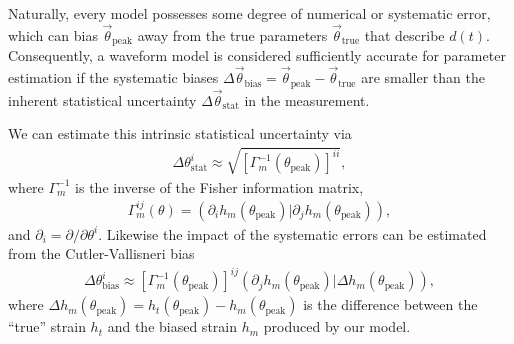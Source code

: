 \documentclass[%
 reprint,
 nofootinbib,
 amsmath,amssymb,
 aps,
 prd,
]{revtex4-2}
\begin{document}
Naturally, every model possesses some degree of numerical or systematic error, which can bias $\vec{\theta}_\mathrm{peak}$ away from the true parameters $\vec{\theta}_\mathrm{true}$ that describe $d(t)$. Consequently, a waveform model is considered sufficiently accurate for parameter estimation if the systematic biases $\Delta \vec{\theta}_\mathrm{bias} = \vec{\theta}_\mathrm{peak} - \vec{\theta}_\mathrm{true}$ are smaller than the inherent statistical uncertainty $\Delta \vec{\theta}_\mathrm{stat}$ in the measurement.

We can estimate this intrinsic statistical uncertainty via
\begin{align} \label{eqn:stat}
    \Delta {\theta}^{i}_\mathrm{stat} \approx \sqrt{\left[\Gamma^{-1}_m(\theta_\mathrm{peak})\right]^{ii}},
\end{align}
where $\Gamma^{-1}_m$ is the inverse of the Fisher information matrix,
\begin{align} \label{eqn:fisher}
    \Gamma^{ij}_m(\theta) = \left( {\partial_i h_m(\theta_\mathrm{peak})} \vert {\partial_j h_m(\theta_\mathrm{peak})} \right),
\end{align}
and $\partial_i = \partial/\partial \theta^i$.
Likewise the impact of the systematic errors can be estimated from the Cutler-Vallisneri bias \cite{CutlVall}
\begin{align} \label{eqn:bias}
    \Delta {\theta}^{i}_\mathrm{bias} \approx \left[\Gamma^{-1}_m(\theta_\mathrm{peak})\right]^{ij} \left(\partial_j h_m(\theta_\mathrm{peak}) \vert \Delta h_m(\theta_\mathrm{peak}) \right),
\end{align}
where $\Delta h_m(\theta_\mathrm{peak}) = h_t(\theta_\mathrm{peak}) - h_m(\theta_\mathrm{peak})$ is the difference between the ``true'' strain $h_t$ and the biased strain $h_m$ produced by our model.
\end{document}
